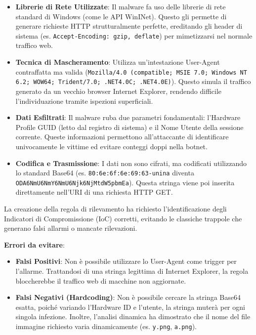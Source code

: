 \begin{itemize}
  \item \textbf{Librerie di Rete Utilizzate}: Il malware fa uso delle librerie di rete standard di Windows (come le API WinINet). Questo gli permette di generare richieste HTTP strutturalmente perfette, ereditando gli header di sistema (es. \texttt{Accept-Encoding: gzip, deflate}) per mimetizzarsi nel normale traffico web.
  \item \textbf{Tecnica di Mascheramento}: Utilizza un'intestazione User-Agent contraffatta ma valida (\texttt{Mozilla/4.0 (compatible; MSIE 7.0; Windows NT 6.2; WOW64; Trident/7.0; .NET4.0C; .NET4.0E)}). Questo simula il traffico generato da un vecchio browser Internet Explorer, rendendo difficile l'individuazione tramite ispezioni superficiali.
  \item \textbf{Dati Esfiltrati}: Il malware ruba due parametri fondamentali: l'Hardware Profile GUID (letto dal registro di sistema) e il Nome Utente della sessione corrente. Queste informazioni permettono all'attaccante di identificare univocamente le vittime ed evitare conteggi doppi nella botnet.
  \item \textbf{Codifica e Trasmissione}: I dati non sono cifrati, ma codificati utilizzando lo standard Base64 (es. \texttt{80:6e:6f:6e:69:63-unina} diventa \texttt{ODA6NmU6NmY6NmU6Njk6NjMtdW5pbmEa}). Questa stringa viene poi inserita direttamente nell'URI di una richiesta HTTP GET.
\end{itemize}

La creazione della regola di rilevamento ha richiesto l'identificazione degli Indicatori di Compromissione (IoC) corretti, evitando le classiche trappole che generano falsi allarmi o mancate rilevazioni.

\textbf{Errori da evitare}:
\begin{itemize}
  \item \textbf{Falsi Positivi}: Non è possibile utilizzare lo User-Agent come trigger per l'allarme. Trattandosi di una stringa legittima di Internet Explorer, la regola bloccherebbe il traffico web di macchine non aggiornate.
  \item \textbf{Falsi Negativi (Hardcoding)}: Non è possibile cercare la stringa Base64 esatta, poiché variando l'Hardware ID e l'utente, la stringa muterà per ogni singola infezione. Inoltre, l'analisi dinamica ha dimostrato che il nome del file immagine richiesto varia dinamicamente (es. \texttt{y.png}, \texttt{a.png}).
\end{itemize}

